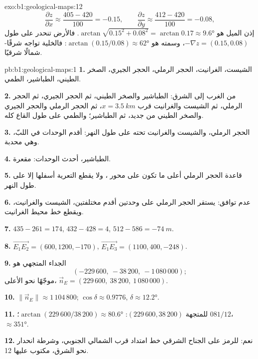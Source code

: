 \begin{solution}{exo:b1:geological-maps:12}
\[
  \frac{\partial z}{\partial x} \approx \frac{405 - 420}{100} = -0.15, \qquad
  \frac{\partial z}{\partial y} \approx \frac{412 - 420}{100} = -0.08,
\]
إذن الميل هو $\arctan\sqrt{0.15^2 + 0.08^2} = \arctan 0.17 \approx
\ang{9.6}$. فالأرض تنحدر على طول $-\nabla z = (0.15, 0.08)$، وسمته هو
$\arctan(0.15/0.08) \approx \ang{62}$: فالخلية تواجه شرقًا-شمالًا شرقيًا.
\end{solution}

\begin{solution}{pb:b1:geological-maps:1}
\textbf{1.} الشيست، الغرانيت، الحجر الرملي، الحجر الجيري، الصخر الطيني، الطباشير، الطمي.

\textbf{2.} من الغرب إلى الشرق: الطباشير والصخر الطيني، ثم الحجر الجيري، ثم الحجر الرملي، ثم الشيست والغرانيت قرب $x = \qty{3.5}{km}$، ثم الحجر الرملي والحجر الجيري والصخر الطيني من جديد، ثم الطباشير؛ والطمي على طول القاع كله.

\textbf{3.} الحجر الرملي، والشيست والغرانيت تحته على طول النهر: أقدم الوحدات في اللبّ، وهي  محدبة.

\textbf{4.} الطباشير، أحدث الوحدات:  مقعرة.

\textbf{5.} قاعدة الحجر الرملي أعلى ما تكون على محور ، ولا يقطع التعرية أسفلها إلا على طول النهر.

\textbf{6.} عدم توافق: يستقر الحجر الرملي على وحدتين أقدم مختلفتين، الشيست والغرانيت، ويقطع خط محيط الغرانيت.

\textbf{7.} $435 - 261 = 174$, $432 - 428 = 4$, $512 - 586 = \qty{-74}{m}$.

\textbf{8.} $\overrightarrow{E_1E_2} = (600, 1200, -170)$,
$\overrightarrow{E_1E_3} = (1100, 400, -248)$.

\textbf{9.} الجداء المتجهي هو
\[
  (-229\,600,\ -38\,200,\ -1\,080\,000);
\]
موجّهًا نحو الأعلى، $\vec n_E = (229\,600,\ 38\,200,\ 1\,080\,000)$.

\textbf{10.} $\|\vec n_E\| \approx 1\,104\,800$; $\cos\delta \approx 0.9776$,
$\delta \approx \ang{12.2}$.

\textbf{11.}  للمتجهة $(229\,600, 38\,200)$: $\arctan(229\,600/38\,200)
\approx \ang{80.6}$؛  $081/12$،  $\approx \ang{351}$.

\textbf{12.} نعم: للرمز على الجناح الشرقي خط امتداد قرب الشمالي الجنوبي، وشرطة انحدار نحو الشرق، مكتوب عليها 12.


\end{solution}
